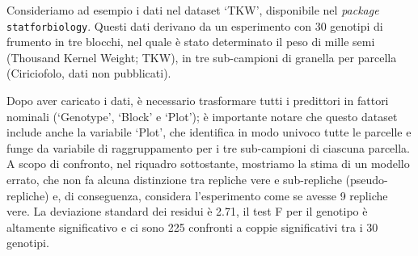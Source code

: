 \documentclass[
  12pt,
]{book}
\begin{document}
Consideriamo ad esempio i dati nel dataset `TKW', disponibile nel \emph{package} \texttt{statforbiology}. Questi dati derivano da un esperimento con 30 genotipi di frumento in tre blocchi, nel quale è stato determinato il peso di mille semi (Thousand Kernel Weight; TKW), in tre sub-campioni di granella per parcella (Ciriciofolo, dati non pubblicati).

Dopo aver caricato i dati, è necessario trasformare tutti i predittori in fattori nominali (`Genotype', `Block' e `Plot'); è importante notare che questo dataset include anche la variabile `Plot', che identifica in modo univoco tutte le parcelle e funge da variabile di raggruppamento per i tre sub-campioni di ciascuna parcella. A scopo di confronto, nel riquadro sottostante, mostriamo la stima di un modello errato, che non fa alcuna distinzione tra repliche vere e sub-repliche (pseudo-repliche) e, di conseguenza, considera l'esperimento come se avesse 9 repliche vere. La deviazione standard dei residui è 2.71, il test F per il genotipo è altamente significativo e ci sono 225 confronti a coppie significativi tra i 30 genotipi.
\end{document}
